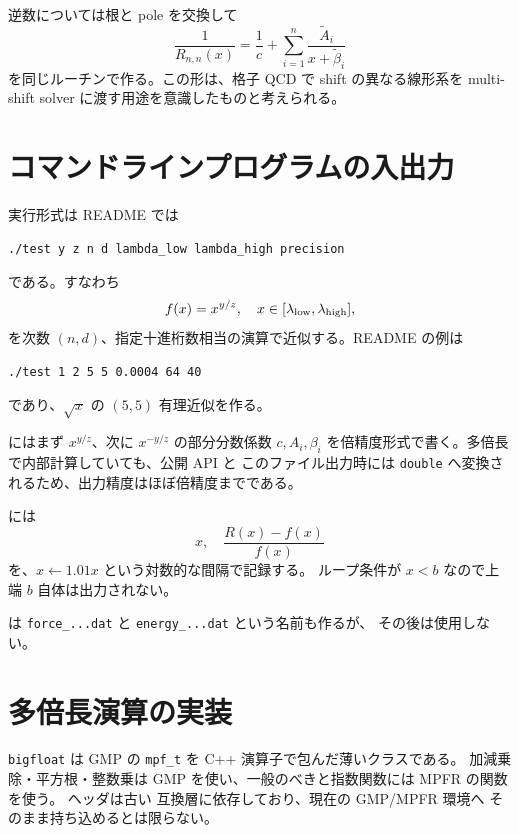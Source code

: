 \documentclass[a4paper,11pt]{ltjsarticle}
\newcommand{\code}[1]{\texttt{#1}}
\begin{document}
逆数については根と pole を交換して
\begin{equation}
 \frac{1}{R_{n,n}(x)}=\frac{1}{c}
 +\sum_{i=1}^{n}\frac{\widetilde A_i}{x+\widetilde\beta_i}
 \end{equation}
を同じルーチンで作る。この形は、格子 QCD で shift の異なる線形系を
multi-shift solver に渡す用途を意識したものと考えられる。

\section{コマンドラインプログラムの入出力}

実行形式は README では
\begin{verbatim}
./test y z n d lambda_low lambda_high precision
\end{verbatim}
である。すなわち
\begin{equation}
 f(x)=x^{y/z},\quad x\in[\lambda_{\rm low},\lambda_{\rm high}],
\end{equation}
を次数 \((n,d)\)、指定十進桁数相当の演算で近似する。README の例は
\begin{verbatim}
./test 1 2 5 5 0.0004 64 40
\end{verbatim}
であり、\(\sqrt{x}\) の \((5,5)\) 有理近似を作る。

 にはまず \(x^{y/z}\)、次に \(x^{-y/z}\) の部分分数係数
\(c,A_i,\beta_i\) を倍精度形式で書く。多倍長で内部計算していても、公開 API と
このファイル出力時には \code{double} へ変換されるため、出力精度はほぼ倍精度までである。

 には
\begin{equation}
  x,\quad \frac{R(x)-f(x)}{f(x)}
\end{equation}
を、\(x\leftarrow1.01x\) という対数的な間隔で記録する。
ループ条件が \(x<b\) なので上端 \(b\) 自体は出力されない。

 は \code{force\_...dat} と \code{energy\_...dat} という名前も作るが、
その後は使用しない。

\section{多倍長演算の実装}

\code{bigfloat} は GMP の \code{mpf\_t} を C++ 演算子で包んだ薄いクラスである。
加減乗除・平方根・整数乗は GMP を使い、一般のべきと指数関数には MPFR の関数を使う。
ヘッダは古い  互換層に依存しており、現在の GMP/MPFR 環境へ
そのまま持ち込めるとは限らない。
\end{document}
